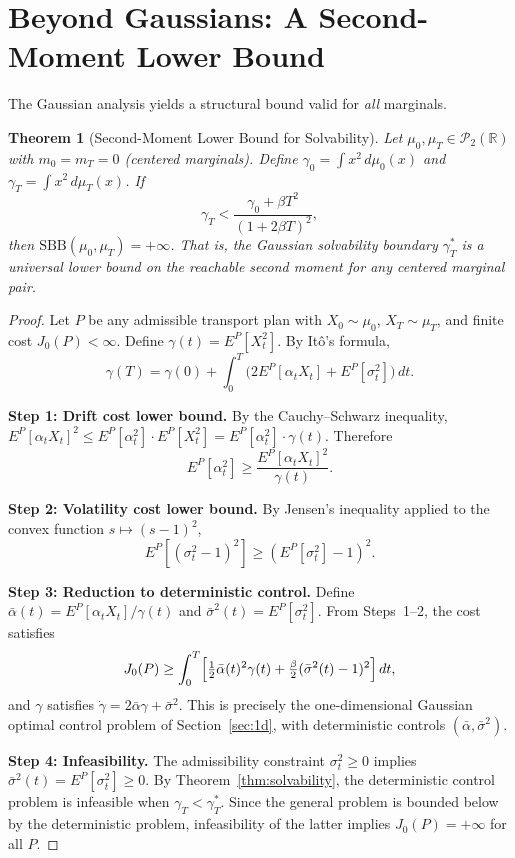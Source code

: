 \documentclass[12pt]{article}
\newtheorem{theorem}{Theorem}[section]
\theoremstyle{definition}
\newcommand{\R}{\mathbb{R}}
\begin{document}
\section{Beyond Gaussians: A Second-Moment Lower Bound}\label{sec:beyond}

The Gaussian analysis yields a structural bound valid for \emph{all} marginals.

\begin{theorem}[Second-Moment Lower Bound for Solvability]\label{thm:nongaussian}
Let $\mu_0, \mu_T \in \mathcal{P}_2(\R)$ with $m_0 = m_T = 0$
(centered marginals).
Define $\gamma_0 = \int x^2\,d\mu_0(x)$ and
$\gamma_T = \int x^2\,d\mu_T(x)$.
If
\begin{equation}\label{eq:nongaussian-bound}
\gamma_T < \frac{\gamma_0 + \beta T^2}{(1 + 2\beta T)^2},
\end{equation}
then $\mathrm{SBB}(\mu_0, \mu_T) = +\infty$.
That is, the Gaussian solvability boundary $\gamma_T^*$ is a
\emph{universal lower bound} on the reachable second moment for
any centered marginal pair.
\end{theorem}

\begin{proof}
Let $P$ be any admissible transport plan with $X_0 \sim \mu_0$,
$X_T \sim \mu_T$, and finite cost $J_0(P) < \infty$.
Define $\gamma(t) = E^P[X_t^2]$.
By It\^o's formula,
\[
\gamma(T) = \gamma(0) + \int_0^T \bigl(2E^P[\alpha_t X_t]
+ E^P[\sigma_t^2]\bigr)\,dt.
\]

\medskip\noindent
\textbf{Step 1: Drift cost lower bound.}
By the Cauchy--Schwarz inequality,
$E^P[\alpha_t X_t]^2 \le E^P[\alpha_t^2]\cdot E^P[X_t^2]
= E^P[\alpha_t^2]\cdot\gamma(t)$.
Therefore
\[
E^P[\alpha_t^2] \ge \frac{E^P[\alpha_t X_t]^2}{\gamma(t)}.
\]

\medskip\noindent
\textbf{Step 2: Volatility cost lower bound.}
By Jensen's inequality applied to the convex function
$s \mapsto (s - 1)^2$,
\[
E^P[(\sigma_t^2 - 1)^2] \ge (E^P[\sigma_t^2] - 1)^2.
\]

\medskip\noindent
\textbf{Step 3: Reduction to deterministic control.}
Define $\bar\alpha(t) = E^P[\alpha_t X_t]/\gamma(t)$ and
$\bar\sigma^2(t) = E^P[\sigma_t^2]$.
From Steps~1--2, the cost satisfies
\[
J_0(P) \ge \int_0^T
\Bigl[\tfrac{1}{2}\bar\alpha(t)^2\gamma(t)
+ \tfrac{\beta}{2}(\bar\sigma^2(t) - 1)^2\Bigr]\,dt,
\]
and $\gamma$ satisfies $\dot\gamma = 2\bar\alpha\gamma + \bar\sigma^2$.
This is precisely the one-dimensional Gaussian optimal control problem
of Section~\ref{sec:1d}, with deterministic controls
$(\bar\alpha, \bar\sigma^2)$.

\medskip\noindent
\textbf{Step 4: Infeasibility.}
The admissibility constraint $\sigma_t^2 \ge 0$ implies
$\bar\sigma^2(t) = E^P[\sigma_t^2] \ge 0$.
By Theorem~\ref{thm:solvability}, the deterministic control problem
is infeasible when $\gamma_T < \gamma_T^*$.
Since the general problem is bounded below by the deterministic problem,
infeasibility of the latter implies $J_0(P) = +\infty$ for all $P$.
\end{proof}
\end{document}
